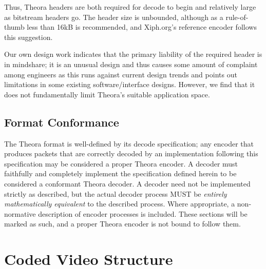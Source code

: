 \documentclass[11pt,letterpaper]{book}
\numberwithin{equation}{chapter}
\numberwithin{figure}{chapter}
\numberwithin{table}{chapter}
\begin{document}
Thus, Theora headers are both required for decode to begin and relatively large
 as bitstream headers go.
The header size is unbounded, although as a rule-of-thumb less than 16kB is
 recommended, and Xiph.org's reference encoder follows this suggestion.

Our own design work indicates that the primary liability of the required header
 is in mindshare; it is an unusual design and thus causes some amount of
 complaint among engineers as this runs against current design trends and
 points out limitations in some existing software/interface designs.
However, we find that it does not fundamentally limit Theora's suitable
 application space.

\section{Format Conformance}

The Theora format is well-defined by its decode specification; any encoder that
 produces packets that are correctly decoded by an implementation following
 this specification may be considered a proper Theora encoder.
A decoder must faithfully and completely implement the specification defined
 herein %
 to be considered a conformant Theora decoder.
A decoder need not be implemented strictly as described, but the
 actual decoder process MUST be {\em entirely mathematically equivalent}
 to the described process.
Where appropriate, a non-normative description of encoder processes is
 included.
These sections will be marked as such, and a proper Theora encoder is not
 bound to follow them.



\chapter{Coded Video Structure}
\end{document}
